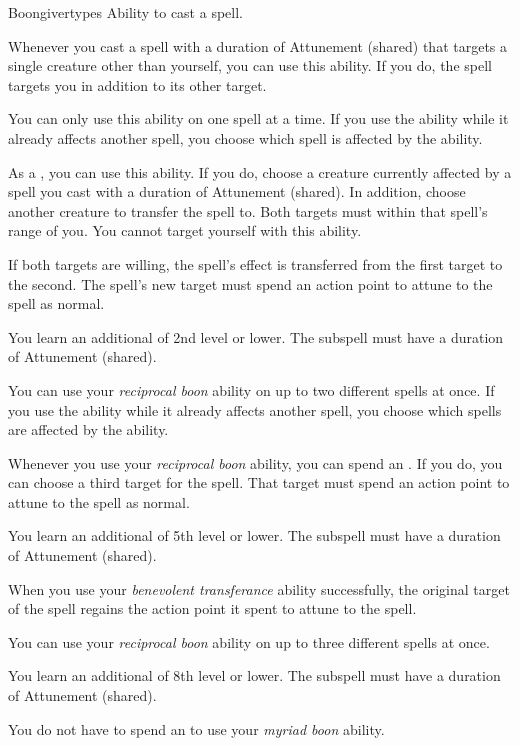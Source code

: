     \begin{feat}{Boongiver}{types}
        \featpre Ability to cast a spell.
        \featben

         Whenever you cast a spell with a duration of Attunement (shared) that targets a single creature other than yourself, you can use this ability.
        If you do, the spell targets you in addition to its other target.

        You can only use this ability on one spell at a time.
        If you use the ability while it already affects another spell, you choose which spell is affected by the ability.

         As a , you can use this ability.
        If you do, choose a creature currently affected by a spell you cast with a duration of Attunement (shared).
        In addition, choose another creature to transfer the spell to.
        Both targets must within that spell's range of you.
        You cannot target yourself with this ability.

        If both targets are willing, the spell's effect is transferred from the first target to the second.
        The spell's new target must spend an action point to attune to the spell as normal.

         You learn an additional  of 2nd level or lower.
        The subspell must have a duration of Attunement (shared).

         You can use your \textit{reciprocal boon} ability on up to two different spells at once.
        If you use the ability while it already affects another spell, you choose which spells are affected by the ability.

         Whenever you use your \textit{reciprocal boon} ability, you can spend an .
        If you do, you can choose a third target for the spell.
        That target must spend an action point to attune to the spell as normal.

         You learn an additional  of 5th level or lower.
        The subspell must have a duration of Attunement (shared).

         When you use your \textit{benevolent transferance} ability successfully, the original target of the spell regains the action point it spent to attune to the spell.

         You can use your \textit{reciprocal boon} ability on up to three different spells at once.

         You learn an additional  of 8th level or lower.
        The subspell must have a duration of Attunement (shared).

         You do not have to spend an  to use your \textit{myriad boon} ability.

    \end{feat}

